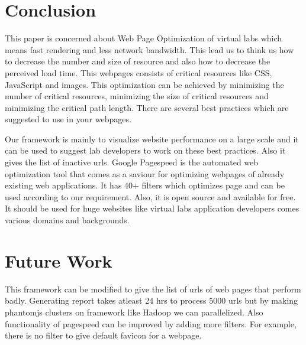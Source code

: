 \documentclass[conference]{IEEEtran}
\begin{document}
\section{Conclusion}
\label{sec-7}
This paper is concerned about Web Page Optimization of virtual labs which means fast rendering and less
network bandwidth. This lead us to think us how to decrease the number and size of
resource and also how to decrease the perceived load time. This webpages consists
of critical resources like CSS, JavaScript and images. This optimization can be
achieved by minimizing the number of critical resources, minimizing the size of
critical resources and minimizing the critical path length. There are several
best practices which are suggested to use in your webpages.

 Our framework is mainly to visualize website performance on a large scale and
it can be used to suggest lab developers to work on these best practices. Also it
gives the list of inactive urls. Google Pagespeed is the automated web optimization
tool that comes as a saviour for optimizing webpages of already existing web applications. It has 40+
filters which optimizes page and can be used according to our requirement. Also,
it is open source and available for free. It should be used for huge websites like virtual labs
application developers comes various domains and backgrounds.
 
\section{Future Work}\label{sec-8}
This framework can be modified to give the list of urls of web pages that perform badly.
Generating report takes atleast 24 hrs to process 5000 urls but by
making phantomjs clusters on framework like Hadoop we can parallelized. Also functionality of pagespeed
can be improved by adding more filters. For example, there is no filter to give default
favicon for a webpage.
\end{document}
